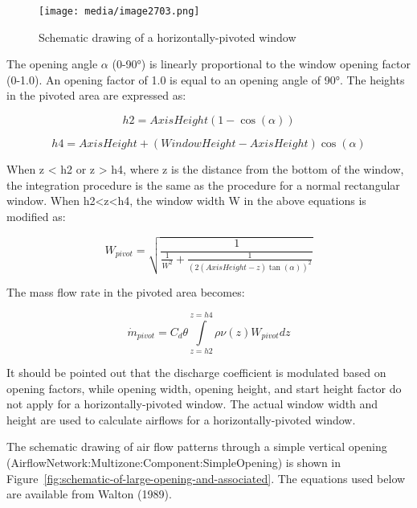 \begin{figure}[hbtp] %
\centering
\texttt{[image: media/image2703.png]}
\caption{Schematic drawing of a horizontally-pivoted window \protect \label{fig:schematic-drawing-of-a-horizontally-pivoted}}
\end{figure}

The opening angle \(\alpha\) (0-90°) is linearly proportional to the window opening factor (0-1.0). An opening factor of 1.0 is equal to an opening angle of 90°. The heights in the pivoted area are expressed as:

\begin{equation}
h2 = AxisHeight(1 - \cos (\alpha ))
\end{equation}

\begin{equation}
h4 = AxisHeight + (WindowHeight - AxisHeight)\cos (\alpha )
\end{equation}

When z \textless{} h2 or z \textgreater{} h4, where z is the distance from the bottom of the window, the integration procedure is the same as the procedure for a normal rectangular window. When h2\textless{}z\textless{}h4, the window width W in the above equations is modified as:

\begin{equation}
W_{pivot} = \sqrt{\frac{1}{{\frac{1}{{{W^2}}} + \frac{1}{{{{(2(AxisHeight - z)\tan (\alpha ))}^2}}}}}}
\end{equation}

The mass flow rate in the pivoted area becomes:

\begin{equation}
{\dot m_{pivot}} = {C_d}\theta \int\limits_{z = h2}^{z = h4} {\rho \nu (z){W_{pivot}}dz}
\end{equation}

It should be pointed out that the discharge coefficient is modulated based on opening factors, while opening width, opening height, and start height factor do not apply for a horizontally-pivoted window. The actual window width and height are used to calculate airflows for a horizontally-pivoted window.

The schematic drawing of air flow patterns through a simple vertical opening (AirflowNetwork:Multizone:Component:SimpleOpening) is shown in Figure~\ref{fig:schematic-of-large-opening-and-associated}. The equations used below are available from Walton (1989).


